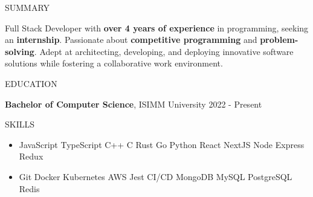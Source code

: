\documentclass{resume} %
\newcommand{\separator}{ \textbar \hspace{0.2cm}}
\begin{document}

\begin{rSection}{SUMMARY}

{Full Stack Developer with \textbf{over 4 years of experience} in programming, seeking an \textbf{internship}. Passionate about \textbf{competitive programming} and \textbf{problem-solving}. Adept at architecting, developing, and deploying innovative software solutions while fostering a collaborative work environment.}

\end{rSection}


\begin{rSection}{EDUCATION}

{\bf Bachelor of Computer Science}, ISIMM University \hfill {2022 - Present}

\end{rSection}


\begin{rSection}{SKILLS}

\begin{itemize}
    \item JavaScript \separator TypeScript \separator C++ \separator C \separator Rust \separator Go \separator Python \separator React \separator NextJS \separator Node \separator Express \separator Redux
    \item Git \separator Docker \separator Kubernetes \separator AWS \separator Jest \separator CI/CD \separator MongoDB \separator MySQL \separator PostgreSQL \separator Redis
\end{itemize}

\end{rSection}
\end{document}
